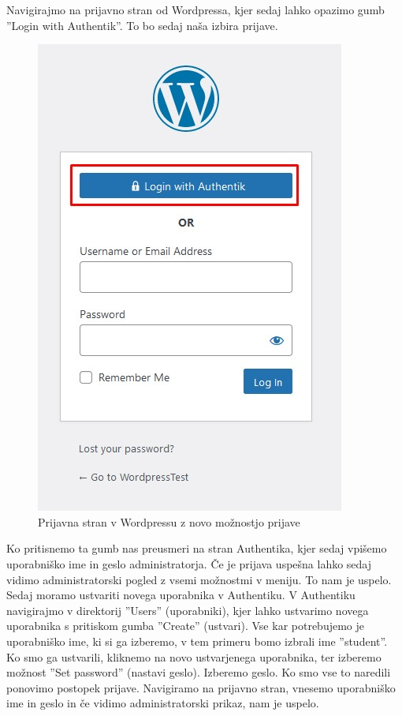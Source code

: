 \documentclass[a4paper,12pt,openright]{book}
\begin{document}
Navigirajmo na prijavno stran od Wordpressa, kjer sedaj lahko opazimo gumb ''Login with Authentik''. To bo sedaj naša izbira prijave. 


\begin{figure}[H]
\includegraphics[scale=0.9]{diploma-FRI-vzorec_11maj2021/WordpressLOGIN.jpg}
\caption{Prijavna stran v Wordpressu z novo možnostjo prijave}
\label{fig}
\end{figure}

Ko pritisnemo ta gumb nas preusmeri na stran Authentika, kjer sedaj vpišemo uporabniško ime in geslo administratorja. Če je prijava uspešna lahko sedaj vidimo administratorski pogled z vsemi možnostmi v meniju. 
\newline
To nam je uspelo. Sedaj moramo ustvariti novega uporabnika v Authentiku. V Authentiku navigirajmo v direktorij ''Users'' (uporabniki), kjer lahko ustvarimo novega uporabnika s pritiskom gumba ''Create'' (ustvari). Vse kar potrebujemo je uporabniško ime, ki si ga izberemo, v tem primeru bomo izbrali ime ''student''. Ko smo ga ustvarili, kliknemo na novo ustvarjenega uporabnika, ter izberemo možnost ''Set password'' (nastavi geslo). Izberemo geslo.  
\newline
Ko smo vse to naredili ponovimo postopek prijave. Navigiramo na prijavno stran, vnesemo uporabniško ime in geslo in če vidimo administratorski prikaz, nam je uspelo. 
\newline
\end{document}
